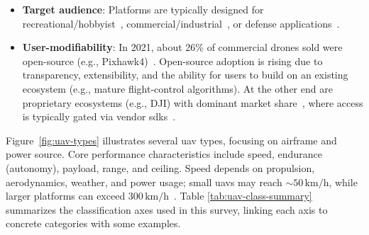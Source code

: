 \begin{itemize}
\item \textbf{Target audience}: Platforms are typically designed for
  recreational/hobbyist~\cite{hobbykingKK2}, commercial/industrial~\cite{skynodeXWebsite},
  or defense applications~\cite{vxWorks-uav-northrop,skynodeS-noJamming-2,theDriveUAVAccident2019}.

  \item \textbf{User-modifiability}: In 2021, about 26\% of commercial drones sold
    were open-source (e.g., Pixhawk4)~\cite{droneAnalyst2021}. Open-source
    adoption is rising due to transparency, extensibility, and the ability for
    users to build on an existing ecosystem (e.g., mature flight-control
    algorithms).
At the other end are proprietary ecosystems
  (e.g., DJI) with dominant market share~\cite{droneAnalyst2021}, where access
  is typically gated via vendor \glspl{sdk}~\cite{djiSDK}.
\end{itemize}

Figure~\ref{fig:uav-types} illustrates several \gls{uav} types, focusing on
airframe and power source. Core performance characteristics include speed,
endurance (autonomy), payload, range, and ceiling. Speed depends on propulsion,
aerodynamics, weather, and power usage; small \glspl{uav} may reach
\(\sim 50\,\mathrm{km/h}\), while larger platforms can exceed
\(300\,\mathrm{km/h}\)~\cite{mohsan2022towards}.
%
Table \ref{tab:uav-class-summary} summarizes the classification axes used in
this survey, linking each axis to concrete categories with some examples.

